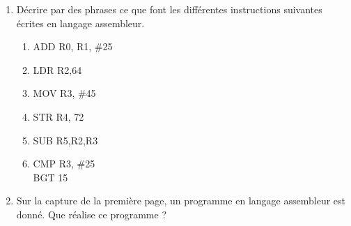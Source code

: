 \documentclass[12pt,a4paper]{article}
\begin{document}
\begin{enumerate}
\item Décrire par des phrases ce que font les différentes instructions suivantes écrites en langage assembleur.\medskip
\begin{enumerate}

\item ADD R0, R1, \#25 \vspace{1.5cm}
\item LDR R2,64 \vspace{1.5cm}
\item MOV R3, \#45 \vspace{1.5cm}
\item STR R4, 72 \vspace{1.5cm}
\item SUB R5,R2,R3 \vspace{1.5cm}
\item CMP R3, \#25 \\
\hspace{0.5cm}BGT 15 \vspace{1.5cm}
\end{enumerate}

\item Sur la capture de la première page, un programme en langage assembleur est donné. Que réalise ce programme ? \vspace{2cm}


\end{enumerate}
\end{document}
